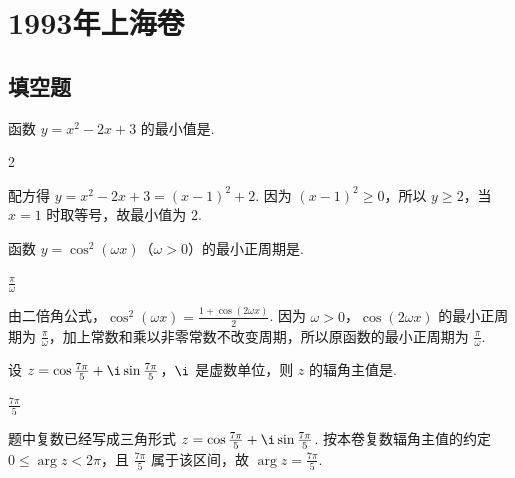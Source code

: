 \documentclass[UTF8,a4paper,oneside,11pt]{ctexbook}
\begin{document}
\mainmatter

\chapter{1993年上海卷}
\section{填空题}

\begin{problem}
函数 \(y = x^2 - 2x + 3\) 的最小值是\fillinblank{}.
\end{problem}

\begin{answer}
2
\end{answer}

\begin{solution}
配方得 \(y=x^2-2x+3=(x-1)^2+2\). 因为 \((x-1)^2\geqslant 0\)，所以 \(y\geqslant 2\)，当 \(x=1\) 时取等号，故最小值为 \(2\).
\end{solution}

\begin{problem}
函数 \(y = \cos^2(\omega x)\)（\(\omega > 0\)）的最小正周期是\fillinblank{}.
\end{problem}

\begin{answer}
\(\frac{\pi}{\omega}\)
\end{answer}

\begin{solution}
由二倍角公式，\(\cos^2(\omega x)=\frac{1+\cos(2\omega x)}{2}\). 因为 \(\omega>0\)，\(\cos(2\omega x)\) 的最小正周期为 \(\frac{\pi}{\omega}\)，加上常数和乘以非零常数不改变周期，所以原函数的最小正周期为 \(\frac{\pi}{\omega}\).
\end{solution}

\begin{problem}
设 \(z = \cos \frac{7\pi}{5} + \i \sin \frac{7\pi}{5}\)，\(\i\) 是虚数单位，则 \(z\) 的辐角主值是\fillinblank{}.
\end{problem}

\begin{answer}
\(\frac{7\pi}{5}\)
\end{answer}

\begin{solution}
题中复数已经写成三角形式 \(z=\cos\frac{7\pi}{5}+\i\sin\frac{7\pi}{5}\). 按本卷复数辐角主值的约定 \(0\leqslant\arg z<2\pi\)，且 \(\frac{7\pi}{5}\) 属于该区间，故 \(\arg z=\frac{7\pi}{5}\).
\end{solution}
\end{document}
